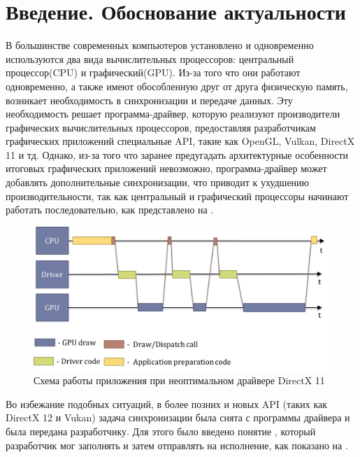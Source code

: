 \chapter*{Введение. Обоснование актуальности} %

В большинстве современных компьютеров установлено и одновременно используются два вида вычислительных процессоров: центральный процессор(CPU) и графический(GPU). Из-за того что они работают одновременно, а также имеют обособленную друг от друга физическую память, возникает необходимость в синхронизации и передаче данных. Эту необходимость решает программа-драйвер, которую реализуют производители графических вычислительных процессоров, предоставляя разработчикам графических приложений специальные API, такие как OpenGL, Vulkan, DirectX 11 и тд. Однако, из-за того что заранее предугадать архитектурные особенности итоговых графических приложений невозможно, программа-драйвер может добавлять дополнительные синхронизации, что приводит к ухудшению производительности, так как центральный и графический процессоры начинают работать последовательно, как представлено на .

\begin{figure}[ht!] 
	\center
	\includegraphics [scale=0.23] {my_folder/images//pipeline_dx11}
	\caption{Схема работы приложения при неоптимальном драйвере DirectX 11} 
	\label{fig:pipeline_dx11}  
\end{figure}

Во избежание подобных ситуаций, в более позних и новых API (таких как DirectX 12 и Vukan) задача синхронизации была снята с программы драйвера и была передана разработчику. Для этого было введено понятие , который разработчик мог заполнять и затем отправлять на исполнение, как показано на .

